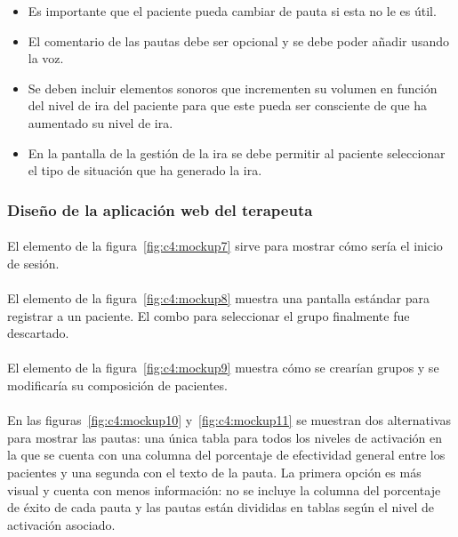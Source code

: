 \begin{itemize}
    \item Es importante que el paciente pueda cambiar de pauta si esta no le es útil.
    \item El comentario de las pautas debe ser opcional y se debe poder añadir usando la voz.
    \item Se deben incluir elementos sonoros que incrementen su volumen en función del nivel de ira del paciente para que este pueda ser consciente de que ha aumentado su nivel de ira.
    \item En la pantalla de la gestión de la ira se debe permitir al paciente seleccionar el tipo de situación que ha generado la ira.
\end{itemize}

\subsubsection{Diseño de la aplicación web del terapeuta}

\paragraph{}
El elemento de la figura~\ref{fig:c4:mockup7} sirve para mostrar cómo sería el inicio de sesión.

\paragraph{}
El elemento de la figura~\ref{fig:c4:mockup8} muestra una pantalla estándar para registrar a un paciente. El combo para seleccionar el grupo finalmente fue descartado.

\paragraph{}
El elemento de la figura~\ref{fig:c4:mockup9} muestra cómo se crearían grupos y se modificaría su composición de pacientes.

\paragraph{}
En las figuras~\ref{fig:c4:mockup10} y~\ref{fig:c4:mockup11} se muestran dos alternativas para mostrar las pautas: una única tabla para todos los niveles de activación en la que se cuenta con una columna del porcentaje de efectividad general entre los pacientes y una segunda con el texto de la pauta. La primera opción es más visual y cuenta con menos información: no se incluye la columna del porcentaje de éxito de cada pauta y las pautas están divididas en tablas según el nivel de activación asociado.


